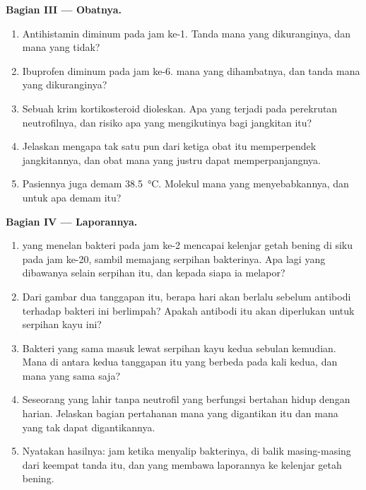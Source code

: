 \begin{problem}
\medskip
\noindent\textbf{Bagian III --- Obatnya.}
\begin{enumerate}[resume]
  \item Antihistamin diminum pada jam ke-1. Tanda mana yang
        dikuranginya, dan mana yang tidak?
  \item Ibuprofen diminum pada jam ke-6.  mana yang
        dihambatnya, dan tanda mana yang dikuranginya?
  \item Sebuah krim kortikosteroid dioleskan. Apa yang terjadi pada
        perekrutan neutrofilnya, dan risiko apa yang mengikutinya bagi
        jangkitan itu?
  \item Jelaskan mengapa tak satu pun dari ketiga obat itu
        memperpendek jangkitannya, dan obat mana yang justru dapat
        memperpanjangnya.
  \item Pasiennya juga demam \qty{38.5}{\celsius}. Molekul mana yang
        menyebabkannya, dan untuk apa demam itu?
\end{enumerate}

\medskip
\noindent\textbf{Bagian IV --- Laporannya.}
\begin{enumerate}[resume]
  \item {} yang menelan bakteri pada jam ke-2 mencapai
        kelenjar getah bening di siku pada jam ke-20, sambil memajang
        serpihan bakterinya. Apa lagi yang dibawanya selain serpihan
        itu, dan kepada siapa ia melapor?
  \item Dari gambar dua tanggapan itu, berapa hari akan berlalu
        sebelum antibodi terhadap bakteri ini berlimpah? Apakah
        antibodi itu akan diperlukan untuk serpihan kayu ini?
  \item Bakteri yang sama masuk lewat serpihan kayu kedua sebulan
        kemudian. Mana di antara kedua tanggapan itu yang berbeda pada
        kali kedua, dan mana yang sama saja?
  \item Seseorang yang lahir tanpa neutrofil yang berfungsi bertahan
        hidup dengan  harian. Jelaskan bagian pertahanan mana
        yang digantikan  itu dan mana yang tak dapat
        digantikannya.
  \item Nyatakan hasilnya: jam ketika  menyalip bakterinya,
         di balik masing-masing dari keempat tanda itu, dan 
        yang membawa laporannya ke kelenjar getah bening.
\end{enumerate}
\end{problem}
